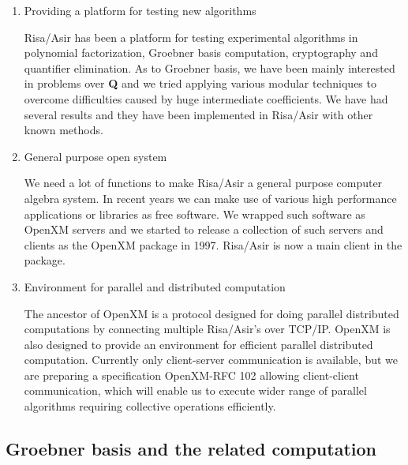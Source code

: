 \documentclass[runningheads]{cl2emult}
\begin{document}
\begin{enumerate}
\item Providing a platform for testing new algorithms

Risa/Asir has been a platform for testing experimental algorithms in
polynomial factorization, Groebner basis computation,
cryptography and quantifier elimination. As to Groebner basis, we have
been mainly interested in problems over {\bf Q} and we tried applying
various modular techniques to overcome difficulties caused by huge
intermediate coefficients. We have had several results and they have
been implemented in Risa/Asir with other known methods.

\item General purpose open system

We need a lot of functions to make Risa/Asir a general purpose
computer algebra system.  In recent years we can make use of various high
performance applications or libraries as free software. We wrapped
such software as OpenXM servers and we started to release a collection
of such servers and clients as the OpenXM package in 1997. Risa/Asir
is now a main client in the package.

\item Environment for parallel and distributed computation

The ancestor of OpenXM is a protocol designed for doing parallel
distributed computations by connecting multiple Risa/Asir's over
TCP/IP. OpenXM is also designed to provide an environment for
efficient parallel distributed computation. Currently only
client-server communication is available, but we are preparing a
specification OpenXM-RFC 102 allowing client-client communication,
which will enable us to execute wider range of parallel algorithms
requiring collective operations efficiently.
\end{enumerate}

\subsection{Groebner basis and the related computation}
\end{document}
